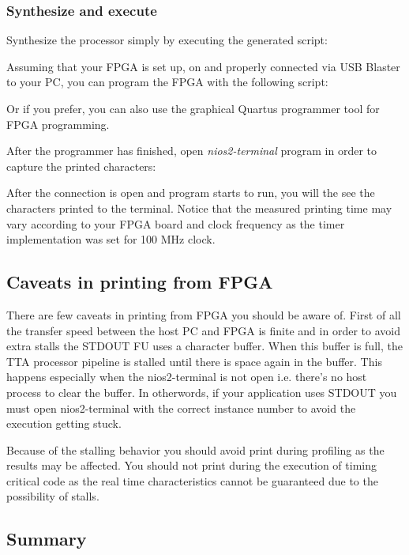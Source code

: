 \documentclass[twoside]{tceusermanual}
\begin{document}
\subsubsection{Synthesize and execute}

Synthesize the processor simply by executing the generated script:


Assuming that your FPGA is set up, on and properly connected via USB
Blaster to your PC, you can program the FPGA with the following script:


Or if you prefer, you can also use the graphical Quartus programmer
tool for FPGA programming.

After the programmer has finished, open \textit{nios2-terminal}
program in order to capture the printed characters:


After the connection is open and program starts to run, you will the
see the characters printed to the terminal. Notice that the measured
printing time may vary according to your FPGA board and clock
frequency as the timer implementation was set for 100 MHz clock.

\subsection{Caveats in printing from FPGA}

There are few caveats in printing from FPGA you should be aware
of. First of all the transfer speed between the host PC and FPGA is
finite and in order to avoid extra stalls the STDOUT FU uses a
character buffer. When this buffer is full, the TTA processor pipeline
is stalled until there is space again in the buffer. This happens
especially when the nios2-terminal is not open i.e. there's no host
process to clear the buffer. In otherwords, if your application uses
STDOUT you must open nios2-terminal with the correct instance number
to avoid the execution getting stuck.

Because of the stalling behavior you should avoid print during
profiling as the results may be affected. You should not print during
the execution of timing critical code as the real time characteristics
cannot be guaranteed due to the possibility of stalls.


\subsection{Summary}
\end{document}
